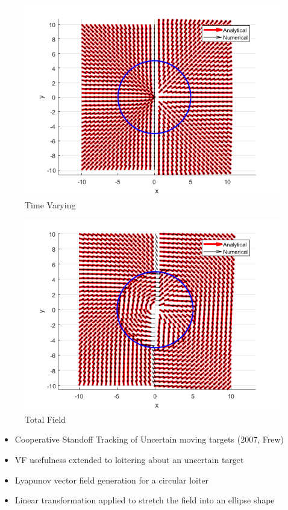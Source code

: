 \documentclass[numbered,pdftex]{ohio-etd}
\begin{document}
\begin{figure}[h]
	\centering
	\includegraphics[width=0.7\linewidth]{"PaperFigures/time varying"}
	\caption{Time Varying}
	\label{fig:time-varying}
\end{figure}


\begin{figure}[h]
	\centering
	\includegraphics[width=0.7\linewidth]{PaperFigures/total}
	\caption{Total Field}
	\label{fig:total}
\end{figure}

\begin{itemize}
	\item Cooperative Standoff Tracking of Uncertain moving targets (2007, Frew)
	\item VF usefulness extended to loitering about an uncertain target
	\item Lyapunov vector field generation for a circular loiter
	\item Linear transformation applied to stretch the field into an ellipse shape
\end{itemize}
\end{document}

